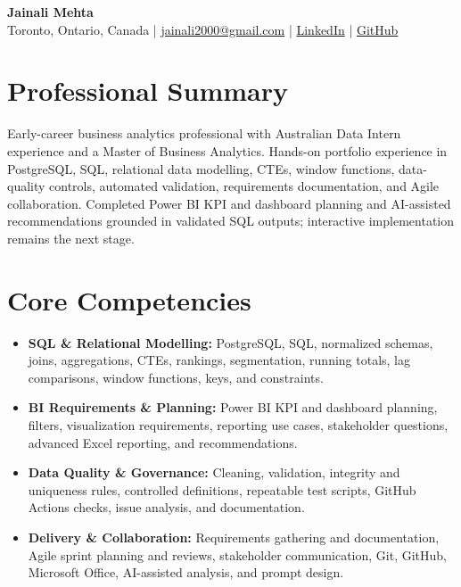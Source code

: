 \documentclass[letterpaper,10pt]{article}
\begin{document}
\begin{center}
  {\fontsize{17}{19}\selectfont\textbf{Jainali Mehta}}\\[2pt]
  \small Toronto, Ontario, Canada \;|\;
  \href{mailto:jainali2000@gmail.com}{jainali2000@gmail.com} \;|\;
  \href{https://www.linkedin.com/in/jainali-mehta}{LinkedIn} \;|\;
  \href{https://github.com/jainalimehta}{GitHub}
\end{center}
\vspace{-7pt}

\section{Professional Summary}
\small Early-career business analytics professional with Australian Data Intern experience and a Master of Business Analytics. Hands-on portfolio experience in PostgreSQL, SQL, relational data modelling, CTEs, window functions, data-quality controls, automated validation, requirements documentation, and Agile collaboration. Completed Power BI KPI and dashboard planning and AI-assisted recommendations grounded in validated SQL outputs; interactive implementation remains the next stage.

\section{Core Competencies}
\begin{itemize}[leftmargin=0.16in,label=\textbullet,topsep=0pt,itemsep=1pt,parsep=0pt]
  \item \small \textbf{SQL \& Relational Modelling:} PostgreSQL, SQL, normalized schemas, joins, aggregations, CTEs, rankings, segmentation, running totals, lag comparisons, window functions, keys, and constraints.
  \item \small \textbf{BI Requirements \& Planning:} Power BI KPI and dashboard planning, filters, visualization requirements, reporting use cases, stakeholder questions, advanced Excel reporting, and recommendations.
  \item \small \textbf{Data Quality \& Governance:} Cleaning, validation, integrity and uniqueness rules, controlled definitions, repeatable test scripts, GitHub Actions checks, issue analysis, and documentation.
  \item \small \textbf{Delivery \& Collaboration:} Requirements gathering and documentation, Agile sprint planning and reviews, stakeholder communication, Git, GitHub, Microsoft Office, AI-assisted analysis, and prompt design.
\end{itemize}
\end{document}
